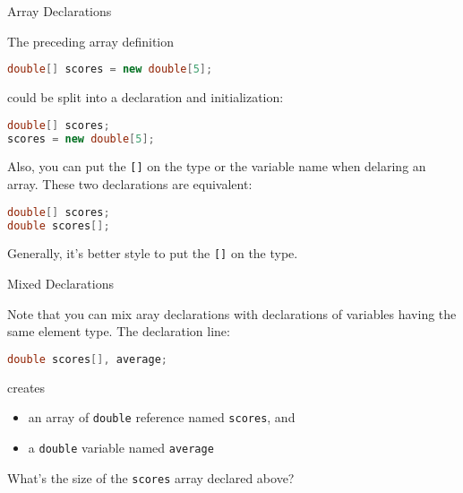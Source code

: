 \documentclass{beamer}
\begin{document}
\begin{frame}[fragile]{Array Declarations}


The preceding array definition
\begin{lstlisting}[language=Java]
double[] scores = new double[5];
\end{lstlisting}
could be split into a declaration and initialization:
\begin{lstlisting}[language=Java]
double[] scores;
scores = new double[5];
\end{lstlisting}
Also, you can put the {\tt []} on the type or the variable name when delaring an array.  These two declarations are equivalent:
\begin{lstlisting}[language=Java]
double[] scores;
double scores[];
\end{lstlisting}
Generally, it's better style to put the {\tt []} on the type.


\end{frame}

\begin{frame}[fragile]{Mixed Declarations}


Note that you can mix aray declarations with declarations of variables having the same element type.  The declaration line:
\begin{lstlisting}[language=Java]
double scores[], average;
\end{lstlisting}
creates
\begin{itemize}
\item an array of {\tt double} reference named {\tt scores}, and
\item a {\tt double} variable named {\tt average}
\end{itemize}

What's the size of the {\tt scores} array declared above?

\end{frame}
\end{document}
